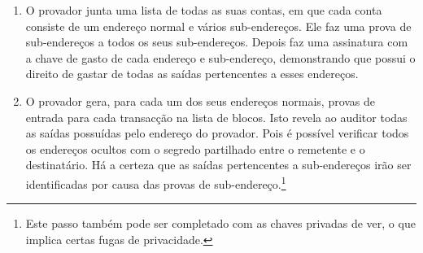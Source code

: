 \begin{enumerate}
    \item O provador junta uma lista de todas as suas contas, em que cada conta consiste de um endereço normal e vários sub-endereços. Ele faz uma prova de sub-endereços a todos os seus sub-endereços. Depois faz uma assinatura com a chave de gasto de cada endereço e sub-endereço, demonstrando que possui o direito de gastar de todas as saídas pertencentes a esses endereços. 
    \item O provador gera, para cada um dos seus endereços normais, provas de entrada para cada transacção na lista de blocos. Isto revela ao auditor todas as saídas possuídas pelo endereço do provador. Pois é possível verificar todos os endereços ocultos com o segredo partilhado entre o remetente e o destinatário. Há a certeza que as saídas pertencentes a sub-endereços irão ser identificadas por causa das provas de sub-endereço.\footnote{Este passo também pode ser completado com as chaves privadas de ver, o que implica certas fugas de privacidade.}


\end{enumerate}
